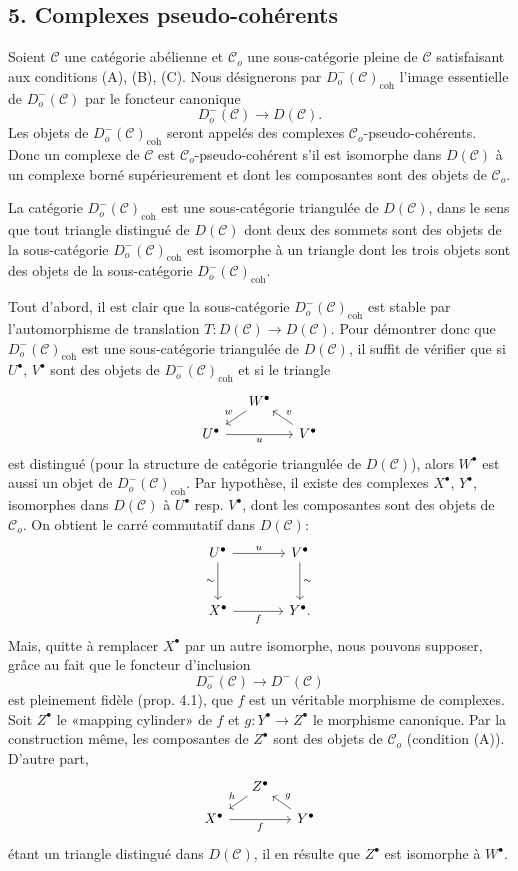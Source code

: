 \documentclass[11pt]{article}
\providecommand{\coh}{\mathrm{coh}}
\providecommand{\cC}{\mathcal C}
\providecommand{\cC}{\mathcal C}
\providecommand{\coh}{\mathrm{coh}}
\begin{document}
\subsection*{5. Complexes pseudo-cohérents}

Soient $\cC$ une catégorie abélienne et $\cC_o$ une sous-catégorie pleine de $\cC$ satisfaisant aux conditions (A), (B), (C). Nous désignerons par $D_o^-(\cC)_{\coh}$ l'image essentielle de $D_o^-(\cC)$ par le foncteur canonique
\[
D_o^-(\cC)\longrightarrow D(\cC).
\]
Les objets de $D_o^-(\cC)_{\coh}$ seront appelés des complexes $\cC_o$-pseudo-cohérents. Donc un complexe de $\cC$ est $\cC_o$-pseudo-cohérent s'il est isomorphe dans $D(\cC)$ à un complexe borné supérieurement et dont les composantes sont des objets de $\cC_o$.

La catégorie $D_o^-(\cC)_{\coh}$ est une sous-catégorie triangulée de $D(\cC)$, dans le sens que tout triangle distingué de $D(\cC)$ dont deux des sommets sont des objets de la sous-catégorie $D_o^-(\cC)_{\coh}$ est isomorphe à un triangle dont les trois objets sont des objets de la sous-catégorie $D_o^-(\cC)_{\coh}$.

Tout d'abord, il est clair que la sous-catégorie $D_o^-(\cC)_{\coh}$ est stable par l'automorphisme de translation $T:D(\cC)\to D(\cC)$. Pour démontrer donc que $D_o^-(\cC)_{\coh}$ est une sous-catégorie triangulée de $D(\cC)$, il suffit de vérifier que si $U^\bullet$, $V^\bullet$ sont des objets de $D_o^-(\cC)_{\coh}$ et si le triangle
\[
\begin{tikzcd}[column sep=small,row sep=small]
& W^\bullet \arrow[dl,"w"']\\
U^\bullet \arrow[rr,"u"']&& V^\bullet \arrow[ul,"v"']
\end{tikzcd}
\]
est distingué (pour la structure de catégorie triangulée de $D(\cC)$), alors $W^\bullet$ est aussi un objet de $D_o^-(\cC)_{\coh}$. Par hypothèse, il existe des complexes $X^\bullet$, $Y^\bullet$, isomorphes dans $D(\cC)$ à $U^\bullet$ resp. $V^\bullet$, dont les composantes sont des objets de $\cC_o$. On obtient le carré commutatif dans $D(\cC)$:
\[
\begin{tikzcd}[column sep=large,row sep=large]
U^\bullet \arrow[r,"u"] \arrow[d,"\sim"']&V^\bullet \arrow[d,"\sim"]\\
X^\bullet \arrow[r,"f"']&Y^\bullet .
\end{tikzcd}
\]
Mais, quitte à remplacer $X^\bullet$ par un autre isomorphe, nous pouvons supposer, grâce au fait que le foncteur d'inclusion
\[
D_o^-(\cC)\longrightarrow D^-(\cC)
\]
est pleinement fidèle (prop. 4.1), que $f$ est un véritable morphisme de complexes. Soit $Z^\bullet$ le «mapping cylinder» de $f$ et $g:Y^\bullet\to Z^\bullet$ le morphisme canonique. Par la construction même, les composantes de $Z^\bullet$ sont des objets de $\cC_o$ (condition (A)). D'autre part,
\[
\begin{tikzcd}[column sep=small,row sep=small]
&Z^\bullet \arrow[dl,"h"']\\
X^\bullet \arrow[rr,"f"']&&Y^\bullet \arrow[ul,"g"']
\end{tikzcd}
\]
étant un triangle distingué dans $D(\cC)$, il en résulte que $Z^\bullet$ est isomorphe à $W^\bullet$.
\end{document}
